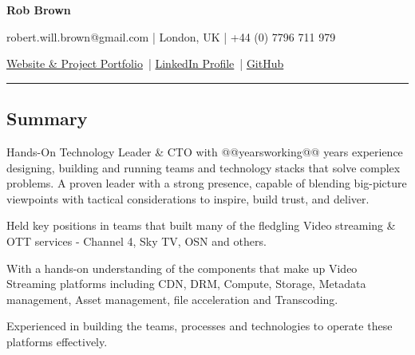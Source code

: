 \documentclass[10pt,a4paper]{article}
\begin{document}
\begin{center}
  {\LARGE \textbf{Rob Brown}}

  robert.will.brown@gmail.com |
  London, UK |
  +44 (0) 7796 711 979

  \href{https://robert-will-brown.github.io}{Website \& Project Portfolio}\ |
  \href{https://www.linkedin.com/in/robert-w-brown/}{LinkedIn Profile}\ |
  \href{https://github.com/robert-will-brown}{GitHub}


\end{center}

\hrule
\vspace{-0.4em}
\subsection*{Summary}

\begin{itemize*}
\item[] Hands-On Technology Leader \& CTO with @@yearsworking@@ years experience designing, building and running teams and technology stacks that solve complex problems. A proven leader with a strong presence, capable of blending big-picture viewpoints with tactical considerations to inspire, build trust, and deliver.

\vspace{+0.4em}
Held key positions in teams that built many of the fledgling Video streaming \& OTT services - Channel 4, Sky TV, OSN and others.

\vspace{+0.4em}
With a hands-on understanding of the components that make up Video Streaming platforms including CDN, DRM, Compute, Storage, Metadata management, Asset management, file acceleration and Transcoding.

\vspace{+0.4em}
Experienced in building the teams, processes and technologies to operate these platforms effectively.

\end{itemize*}
\end{document}
